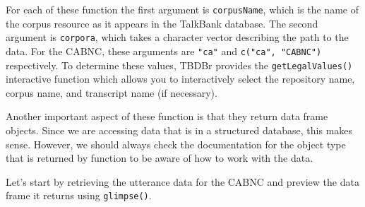 \documentclass[
  letterpaper,
  DIV=11,
  numbers=noendperiod]{scrreprt}
\theoremstyle{definition}
\theoremstyle{remark}
\begin{document}
For each of these function the first argument is \texttt{corpusName},
which is the name of the corpus resource as it appears in the TalkBank
database. The second argument is \texttt{corpora}, which takes a
character vector describing the path to the data. For the CABNC, these
arguments are \texttt{"ca"} and \texttt{c("ca",\ "CABNC")} respectively.
To determine these values, TBDBr provides the \texttt{getLegalValues()}
interactive function which allows you to interactively select the
repository name, corpus name, and transcript name (if necessary).

Another important aspect of these function is that they return data
frame objects. Since we are accessing data that is in a structured
database, this makes sense. However, we should always check the
documentation for the object type that is returned by function to be
aware of how to work with the data.

Let's start by retrieving the utterance data for the CABNC and preview
the data frame it returns using \texttt{glimpse()}.
\end{document}

